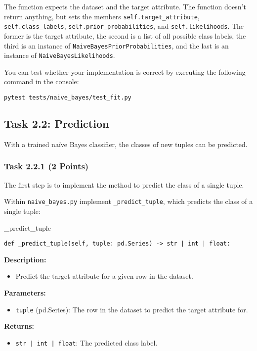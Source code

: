 \documentclass[
english,
smallborders
]{i6prcsht}
\newcommand{\points}[1]{\hfill \color{red}(#1 Points)\color{black}}
\begin{document}
\vspace*{0.5cm}

The function expects the dataset and the target attribute. The function doesn't return anything, but sets the members \texttt{self.target\_attribute}, \texttt{self.class\_labels}, \texttt{self.prior\_probabilities}, and \texttt{self.likelihoods}. The former is the target attribute, the second is a list of all possible class labels, the third is an instance of \texttt{NaiveBayesPriorProbabilities}, and the last is an instance of \texttt{NaiveBayesLikelihoods}.

You can test whether your implementation is correct by executing the following command in the console:

\vspace*{0.3cm}

\begin{lstlisting}
pytest tests/naive_bayes/test_fit.py
\end{lstlisting}

\newpage

\subsection*{Task 2.2: Prediction}

With a trained naïve Bayes classifier, the classes of new tuples can be predicted.

\subsubsection*{Task 2.2.1 \points{2}}

The first step is to implement the method to predict the class of a single tuple.

Within \texttt{naive\_bayes.py} implement \texttt{\_predict\_tuple}, which predicts the class of a single tuple:

\vspace*{0.3cm}

\begin{functionbox}{\_predict\_tuple}
	\begin{lstlisting}[numbers=none]
def _predict_tuple(self, tuple: pd.Series) -> str | int | float:
\end{lstlisting}
	
	\textbf{Description:}
	\begin{itemize}[leftmargin=*,topsep=0pt]
		\item Predict the target attribute for a given row in the dataset.
	\end{itemize}
	
	\textbf{Parameters:}
	\begin{itemize}[leftmargin=*,topsep=0pt]
		\item \texttt{tuple} (pd.Series): The row in the dataset to predict the target attribute for.
	\end{itemize}
	
	\textbf{Returns:}
	\begin{itemize}[leftmargin=*,topsep=0pt]
		\item \texttt{str | int | float}: The predicted class label.
	\end{itemize}
\end{functionbox}
\end{document}
